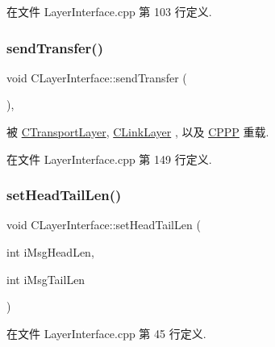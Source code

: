 在文件 Layer\+Interface.\+cpp 第 103 行定义.

\mbox{\label{class_c_layer_interface_a02a144b97e69df2dc47149e5314cba2d}} 
\subsubsection{\texorpdfstring{send\+Transfer()}{sendTransfer()}}
{\footnotesize\ttfamily void C\+Layer\+Interface\+::send\+Transfer (\begin{DoxyParamCaption}{ }\end{DoxyParamCaption})\hspace{0.3cm}{\ttfamily [protected]}, {\ttfamily [virtual]}}



被 \hyperlink{class_c_transport_layer_a5755c5d7f4158bb08303b98042b24ca1}{C\+Transport\+Layer}, \hyperlink{class_c_link_layer_ab6a4124af45069fefeddff784ea26e3f}{C\+Link\+Layer} , 以及 \hyperlink{class_c_p_p_p_a1d8be0d39e44ad6e6971329106e5900d}{C\+P\+PP} 重载.



在文件 Layer\+Interface.\+cpp 第 149 行定义.

\mbox{\label{class_c_layer_interface_a006961acbffa93cc0936010432b8e612}} 
\subsubsection{\texorpdfstring{set\+Head\+Tail\+Len()}{setHeadTailLen()}}
{\footnotesize\ttfamily void C\+Layer\+Interface\+::set\+Head\+Tail\+Len (\begin{DoxyParamCaption}\item[{int}]{i\+Msg\+Head\+Len,  }\item[{int}]{i\+Msg\+Tail\+Len }\end{DoxyParamCaption})}



在文件 Layer\+Interface.\+cpp 第 45 行定义.

\mbox{\label{class_c_layer_interface_aa77c283e1d595a23513ff21cbf72ab97}} 

